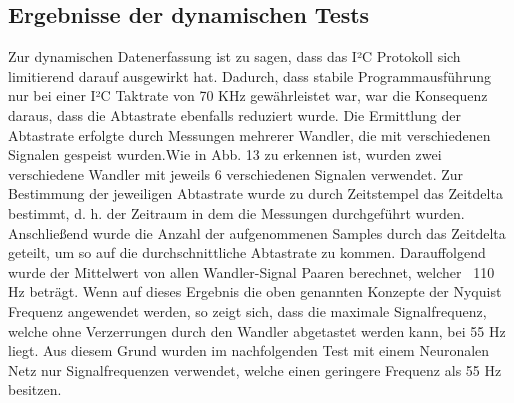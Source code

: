 \begin{flushleft}

\subsection{Ergebnisse der dynamischen Tests}
Zur dynamischen Datenerfassung ist zu sagen, dass das I²C Protokoll sich limitierend darauf ausgewirkt hat. Dadurch, dass stabile Programmausführung nur bei einer I²C Taktrate von 70 KHz gewährleistet war, war die Konsequenz daraus, dass die Abtastrate ebenfalls reduziert wurde. Die Ermittlung der Abtastrate erfolgte durch Messungen mehrerer Wandler, die mit verschiedenen Signalen gespeist wurden.Wie in Abb. 13 zu erkennen ist, wurden zwei verschiedene Wandler mit jeweils 6 verschiedenen Signalen verwendet. Zur Bestimmung der jeweiligen Abtastrate wurde zu durch Zeitstempel das Zeitdelta bestimmt, d. h. der Zeitraum in dem die Messungen durchgeführt wurden. Anschließend wurde die Anzahl der aufgenommenen Samples durch das Zeitdelta geteilt, um so auf die durchschnittliche Abtastrate zu kommen. Darauffolgend wurde der Mittelwert von allen Wandler-Signal Paaren berechnet, welcher ~110 Hz beträgt. Wenn auf dieses Ergebnis die oben genannten Konzepte der Nyquist Frequenz angewendet werden, so zeigt sich, dass die maximale Signalfrequenz, welche ohne Verzerrungen durch den Wandler abgetastet werden kann, bei 55 Hz liegt. Aus diesem Grund wurden im nachfolgenden Test mit einem Neuronalen Netz nur Signalfrequenzen verwendet, welche einen geringere Frequenz als 55 Hz besitzen. 

\begin{tabular}[h]{r|r}
\label{Abtastratentabellle}


\end{tabular}
\end{flushleft}
